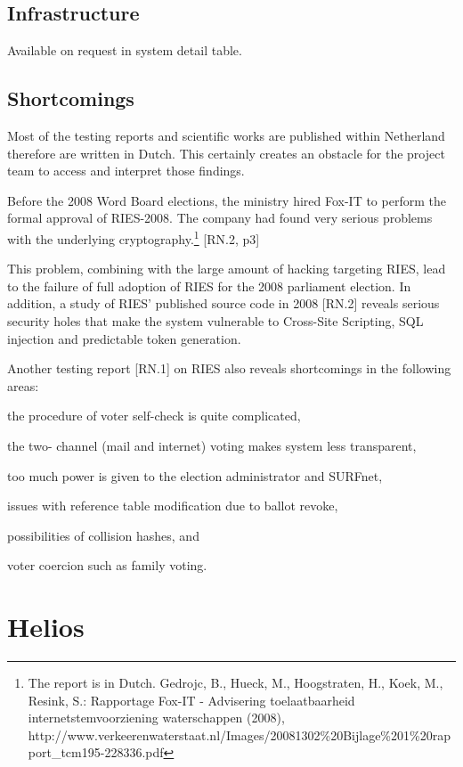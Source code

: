 \subsection{Infrastructure}

Available on request in system detail table.

\subsection{Shortcomings}

Most of the testing reports and scientific works are published within Netherland therefore are written in Dutch. This certainly creates an obstacle for the project team to access and interpret those findings.

Before the 2008 Word Board elections, the ministry hired Fox-IT to perform the formal approval of RIES-2008. The company had found very serious problems with the underlying cryptography.\footnote{The report is in Dutch. Gedrojc, B., Hueck, M., Hoogstraten, H., Koek, M., Resink, S.: Rapportage Fox-IT - Advisering toelaatbaarheid internetstemvoorziening waterschappen (2008), http://www.verkeerenwaterstaat.nl/Images/20081302\%20Bijlage\%201\%20rapport\_tcm195-228336.pdf} [RN.2, p3]

This problem, combining with the large amount of hacking targeting RIES, lead to the failure of full adoption of RIES for the 2008 parliament election. In addition, a study of RIES' published source code in 2008 [RN.2] reveals serious security holes that make the system vulnerable to Cross-Site Scripting, SQL injection and predictable token generation.

Another testing report [RN.1] on RIES also reveals shortcomings in the following areas:
\begin{enumerate*}
  \item the procedure of voter self-check is quite complicated,
  \item the two- channel (mail and internet) voting makes system less transparent,
  \item too much power is given to the election administrator and SURFnet,
  \item issues with reference table modification due to ballot revoke,
  \item possibilities of collision hashes, and
  \item voter coercion such as family voting.
\end{enumerate*}

\section{Helios}

